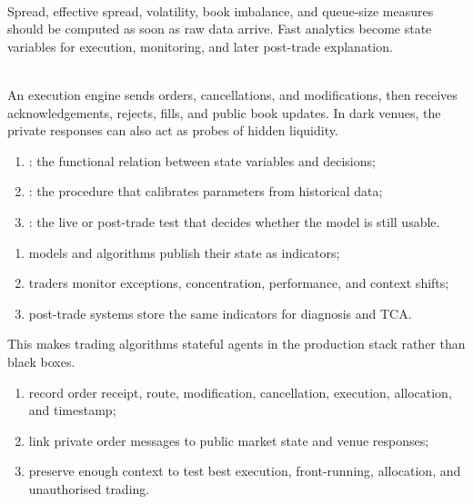 \documentclass[a4paper,oneside,openany]{book}
\begin{document}
\begin{mechanism} \\
Spread, effective spread, volatility, book imbalance, and queue-size measures should be computed as soon as raw data arrive. Fast analytics become state variables for execution, monitoring, and later post-trade explanation.
\end{mechanism}

\begin{caveat} \\
An execution engine sends orders, cancellations, and modifications, then receives acknowledgements, rejects, fills, and public book updates. In dark venues, the private responses can also act as probes of hidden liquidity.
\end{caveat}

\begin{taxonomy} 
\begin{enumerate}[label=\roman*.]
\setlength{\itemsep}{0pt}
\item {}: the functional relation between state variables and decisions;
\item {}: the procedure that calibrates parameters from historical data;
\item {}: the live or post-trade test that decides whether the model is still usable.
\end{enumerate}
\end{taxonomy}

\begin{process} 
\begin{enumerate}[label=\roman*.]
\setlength{\itemsep}{0pt}
\item models and algorithms publish their state as indicators;
\item traders monitor exceptions, concentration, performance, and context shifts;
\item post-trade systems store the same indicators for diagnosis and TCA.
\end{enumerate}
This makes trading algorithms stateful agents in the production stack rather than black boxes.
\end{process}

\begin{process} 
\begin{enumerate}[label=\roman*.]
\setlength{\itemsep}{0pt}
\item record order receipt, route, modification, cancellation, execution, allocation, and timestamp;
\item link private order messages to public market state and venue responses;
\item preserve enough context to test best execution, front-running, allocation, and unauthorised trading.
\end{enumerate}
\end{process}
\end{document}
